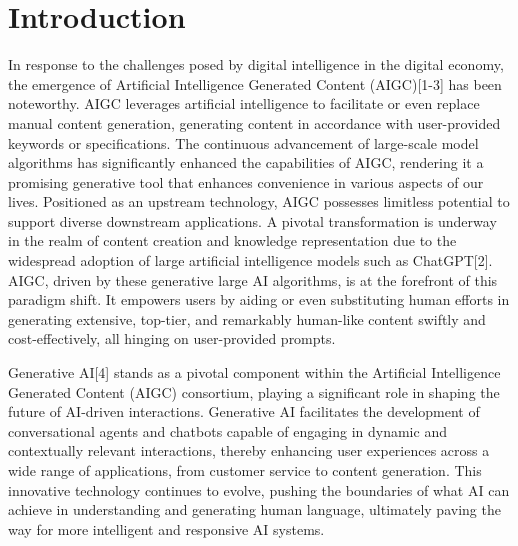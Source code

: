\documentclass[conference]{IEEEtran}
\begin{document}
\section{Introduction}
In response to the challenges posed by digital intelligence in the digital economy, the emergence of Artificial Intelligence Generated Content (AIGC)[1-3] has been noteworthy. AIGC leverages artificial intelligence to facilitate or even replace manual content generation, generating content in accordance with user-provided keywords or specifications. The continuous advancement of large-scale model algorithms has significantly enhanced the capabilities of AIGC, rendering it a promising generative tool that enhances convenience in various aspects of our lives. Positioned as an upstream technology, AIGC possesses limitless potential to support diverse downstream applications. A pivotal transformation is underway in the realm of content creation and knowledge representation due to the widespread adoption of large artificial intelligence models such as ChatGPT[2]. AIGC, driven by these generative large AI algorithms, is at the forefront of this paradigm shift. It empowers users by aiding or even substituting human efforts in generating extensive, top-tier, and remarkably human-like content swiftly and cost-effectively, all hinging on user-provided prompts. 

Generative AI[4] stands as a pivotal component within the Artificial Intelligence Generated Content (AIGC) consortium, playing a significant role in shaping the future of AI-driven interactions. Generative AI facilitates the development of conversational agents and chatbots capable of engaging in dynamic and contextually relevant interactions, thereby enhancing user experiences across a wide range of applications, from customer service to content generation. This innovative technology continues to evolve, pushing the boundaries of what AI can achieve in understanding and generating human language, ultimately paving the way for more intelligent and responsive AI systems.
\end{document}
